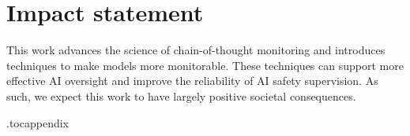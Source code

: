 \documentclass{article}
\theoremstyle{plain}
\begin{document}


\section*{Impact statement}
This work advances the science of chain-of-thought monitoring and introduces techniques to make models more monitorable. These techniques can support more effective AI oversight and improve the reliability of AI safety supervision.
As such, we expect this work to have largely positive societal consequences.






\clearpage
\appendix
\onecolumn
\etocdepthtag.toc{appendix}  %

\begingroup
  \tableofcontents
\endgroup
\clearpage
% 


\end{document}

